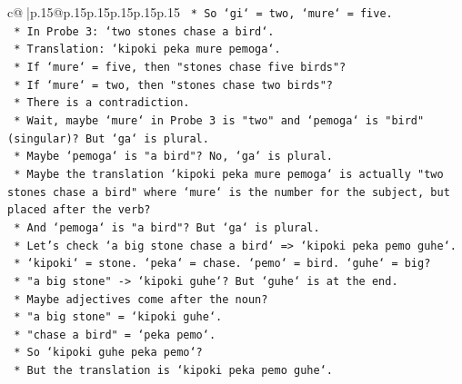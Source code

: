 \documentclass{article}
\begin{document}
{\begin{supertabular}{c@{$\;$}|p{.15\linewidth}@{}p{.15\linewidth}p{.15\linewidth}p{.15\linewidth}p{.15\linewidth}p{.15\linewidth}}
{{{\texttt{                                    *   So `gi` = two, `mure` = five.} \\
\texttt{                                    *   In Probe 3: `two stones chase a bird`.} \\
\texttt{                                    *   Translation: `kipoki peka mure pemoga`.} \\
\texttt{                                    *   If `mure` = five, then "stones chase five birds"?} \\
\texttt{                                    *   If `mure` = two, then "stones chase two birds"?} \\
\texttt{                                    *   There is a contradiction.} \\
\texttt{                                    *   Wait, maybe `mure` in Probe 3 is "two" and `pemoga` is "bird" (singular)? But `ga` is plural.} \\
\texttt{                                    *   Maybe `pemoga` is "a bird"? No, `ga` is plural.} \\
\texttt{                                    *   Maybe the translation `kipoki peka mure pemoga` is actually "two stones chase a bird" where `mure` is the number for the subject, but placed after the verb?} \\
\texttt{                                    *   And `pemoga` is "a bird"? But `ga` is plural.} \\
\texttt{                                    *   Let's check `a big stone chase a bird` => `kipoki peka pemo guhe`.} \\
\texttt{                                        *   `kipoki` = stone. `peka` = chase. `pemo` = bird. `guhe` = big?} \\
\texttt{                                        *   "a big stone" {-}> `kipoki guhe`? But `guhe` is at the end.} \\
\texttt{                                        *   Maybe adjectives come after the noun?} \\
\texttt{                                        *   "a big stone" = `kipoki guhe`.} \\
\texttt{                                        *   "chase a bird" = `peka pemo`.} \\
\texttt{                                        *   So `kipoki guhe peka pemo`?} \\
\texttt{                                        *   But the translation is `kipoki peka pemo guhe`.} \\
}}}
\end{supertabular}}
\end{document}
